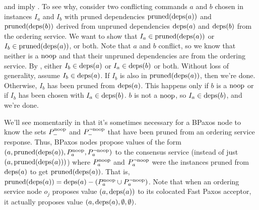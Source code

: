  and  imply
. To see why, consider two conflicting commands $a$
and $b$ chosen in instances $I_a$ and $I_b$ with pruned dependencies
$\text{pruned}(\text{deps}(a))$ and $\text{pruned}(\text{deps}(b))$ derived from unpruned dependencies
$\text{deps}(a)$ and $\text{deps}(b)$ from the ordering service. We want to show that $I_a
\in \text{pruned}(\text{deps}(a))$ or $I_b \in \text{pruned}(\text{deps}(a))$, or both. Note that $a$
and $b$ conflict, so we know that neither is a $\text{noop}$ and that their unpruned
dependencies are from the ordering service.
%
By , either $I_b \in \text{deps}(a)$ or $I_a \in \text{deps}(b)$ or
both. Without loss of generality, assume $I_b \in \text{deps}(a)$. If $I_b$ is also
in $\text{pruned}(\text{deps}(a))$, then we're done. Otherwise, $I_b$ has been pruned from
$\text{deps}(a)$. This happens only if $b$ is a $\text{noop}$ or if $I_b$ has been chosen
with $I_a \in \text{deps}(b)$. $b$ is not a $\text{noop}$, so $I_a \in \text{deps}(b)$, and we're
done.

We'll see momentarily in  that it's sometimes necessary
for a BPaxos node to know the sets $P^{\text{noop}}_{-}$ and $P^{\lnot \text{noop}}_{-}$ that have
been pruned from an ordering service response. Thus, BPaxos nodes propose
values of the form $(a, \text{pruned}(\text{deps}(a)), P^{\text{noop}}_{a}, P^{\lnot \text{noop}}_{a})$ to the
consensus service (instead of just $(a, \text{pruned}(\text{deps}(a)))$) where $P^{\text{noop}}_{a}$
and $P^{\lnot \text{noop}}_{a}$ were the instances pruned from $\text{deps}(a)$ to get
$\text{pruned}(\text{deps}(a))$. That is, $\text{pruned}(\text{deps}(a)) = \text{deps}(a) - (P^{\text{noop}}_{a} \cup
P^{\lnot \text{noop}}_{a})$. Note that when an ordering service node $o_j$ proposes value
$(a, \text{deps}(a))$ to its colocated Fast Paxos acceptor, it actually proposes
value $(a, \text{deps}(a), \emptyset, \emptyset)$.

